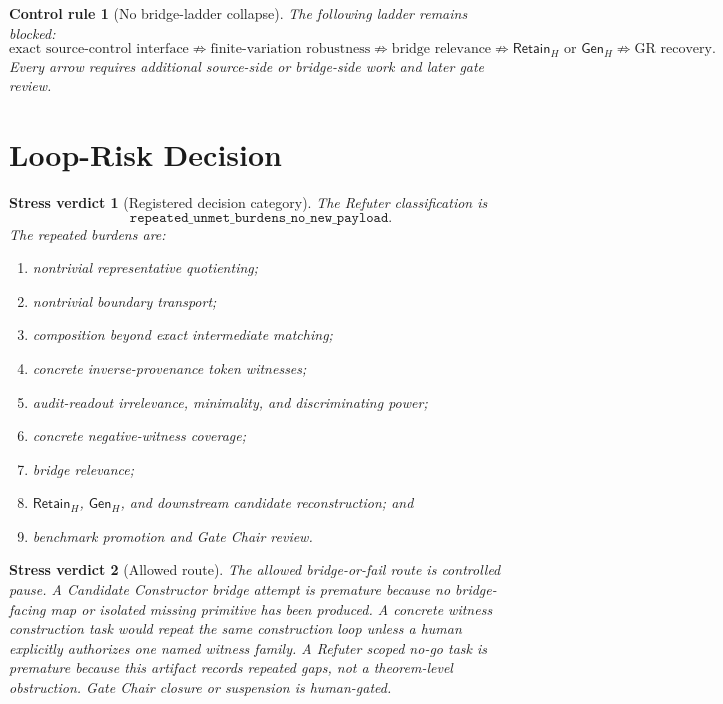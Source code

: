\documentclass[11pt]{article}
\newcommand{\RetainH}{\mathsf{Retain}_{H}}
\newcommand{\GenH}{\mathsf{Gen}_{H}}
\newtheorem{controlrule}{Control rule}
\newtheorem{verdict}{Stress verdict}
\begin{document}
\begin{controlrule}[No bridge-ladder collapse]
The following ladder remains blocked:
\[
\text{exact source-control interface}
\not\Rightarrow
\text{finite-variation robustness}
\not\Rightarrow
\text{bridge relevance}
\not\Rightarrow
\RetainH \text{ or } \GenH
\not\Rightarrow
\text{GR recovery}.
\]
Every arrow requires additional source-side or bridge-side work and
later gate review.
\end{controlrule}

\section{Loop-Risk Decision}

\begin{verdict}[Registered decision category]
The Refuter classification is
\[
\texttt{repeated\_unmet\_burdens\_no\_new\_payload}.
\]
The repeated burdens are:
\begin{enumerate}
    \item nontrivial representative quotienting;
    \item nontrivial boundary transport;
    \item composition beyond exact intermediate matching;
    \item concrete inverse-provenance token witnesses;
    \item audit-readout irrelevance, minimality, and discriminating
    power;
    \item concrete negative-witness coverage;
    \item bridge relevance;
    \item \(\RetainH\), \(\GenH\), and downstream candidate
    reconstruction; and
    \item benchmark promotion and Gate Chair review.
\end{enumerate}
\end{verdict}

\begin{verdict}[Allowed route]
The allowed bridge-or-fail route is controlled pause. A Candidate
Constructor bridge attempt is premature because no bridge-facing map
or isolated missing primitive has been produced. A concrete witness
construction task would repeat the same construction loop unless a
human explicitly authorizes one named witness family. A Refuter
scoped no-go task is premature because this artifact records repeated
gaps, not a theorem-level obstruction. Gate Chair closure or
suspension is human-gated.
\end{verdict}
\end{document}
